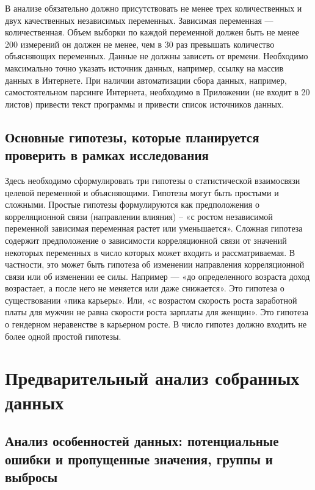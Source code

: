 \documentclass[12pt]{article}
\begin{document}
В анализе обязательно должно присутствовать не менее трех количественных и
двух качественных независимых переменных. Зависимая переменная — количественная.
Объем выборки по каждой переменной должен быть не менее 200 измерений он должен
не менее, чем в 30 раз превышать количество объясняющих переменных. Данные не
должны зависеть от времени. Необходимо максимально точно указать источник
данных, например, ссылку на массив данных в Интернете. При наличии автоматизации
сбора данных, например, самостоятельном парсинге Интернета, необходимо в
Приложении (не входит в 20 листов) привести текст программы и привести список
источников данных.

\subsection{Основные гипотезы, которые планируется проверить в рамках исследования}

Здесь необходимо сформулировать три гипотезы о статистической взаимосвязи
целевой переменной и объясняющими. Гипотезы могут быть простыми и сложными.
Простые гипотезы формулируются как предположения о корреляционной связи
(направлении влияния) – «с ростом независимой переменной зависимая переменная
растет или уменьшается». Сложная гипотеза содержит предположение о зависимости
корреляционной связи от значений некоторых переменных в число которых может входить
и рассматриваемая. В частности, это может быть гипотеза об изменении направления
корреляционной связи или об изменении ее силы. Например — «до определенного
возраста доход возрастает, а после него не меняется или даже снижается». Это гипотеза о
существовании «пика карьеры». Или, «с возрастом скорость роста заработной платы для
мужчин не равна скорости роста зарплаты для женщин». Это гипотеза о гендерном
неравенстве в карьерном росте. В число гипотез должно входить не более одной простой
гипотезы.

\section{Предварительный анализ собранных данных}
\subsection{Анализ особенностей данных: потенциальные ошибки и пропущенные значения,
группы и выбросы}
\end{document}
